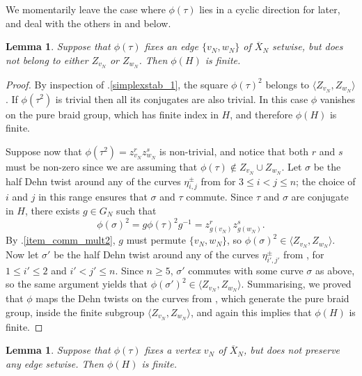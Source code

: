 \documentclass[svgnames]{amsart}
\theoremstyle{plain}
\newtheorem{lem}[thm]{Lemma}
\theoremstyle{definition}
\newcommand{\ov}[1]{\overline{#1}}
\begin{document}
    \noindent We momentarily leave the case where $\phi(\tau)$ lies in a cyclic direction for later, and deal with the others in  and  below.
    \begin{lem}\label{lem:fix_edge}
        Suppose that $\phi(\tau)$ fixes an edge $\{v_N,w_N\}$ of $\ov X_N$ setwise, but does not belong to either $Z_{v_N}$ or $Z_{w_N}$. Then $\phi(H)$ is finite.
    \end{lem}

\begin{proof}
    By inspection of .\eqref{simplexstab_1}, the square $\phi(\tau)^2$ belongs to $\langle Z_{v_N},Z_{w_N}\rangle$. If $\phi(\tau^2)$ is trivial then all its conjugates are also trivial. In this case $\phi$ vanishes on the pure braid group, which has finite index in $H$, and therefore $\phi(H)$ is finite.

    Suppose now that $\phi(\tau^2)=z_{v_N}^r z_{w_N}^s$ is non-trivial, and notice that both $r$ and $s$ must be non-zero since we are assuming that $\phi(\tau)\not \in Z_{v_N}\cup Z_{w_N}$. Let $\sigma$ be the half Dehn twist around any of the curves $\eta^\pm_{i,j}$ from   for $3\le i<j\le n $; the choice of $i$ and $j$ in this range ensures that $\sigma$ and $\tau$ commute. Since $\tau$ and $\sigma$ are conjugate in $H$, there exists $g\in G_N$ such that 
    $$\phi(\sigma)^2=g\phi(\tau)^2g^{-1}=z_{g(v_N)}^r z_{g(w_N)}^s.$$
    By .\eqref{item_comm_mult2}, $g$ must permute $\{v_N,w_N\}$, so $\phi(\sigma)^2\in \langle Z_{v_N}, Z_{w_N}\rangle$. Now let $\sigma'$ be the half Dehn twist around any of the curves $\eta^\pm_{i',j'}$ from , for $1\le i'\le 2$ and $i'<j'\le n $. Since $n\ge 5$, $\sigma'$ commutes with some curve $\sigma$ as above, so the same argument yields that 
    $\phi(\sigma')^2\in \langle Z_{v_N}, Z_{w_N}\rangle$. Summarising, we proved that $\phi$ maps the Dehn twists on the curves from , which generate the pure braid group, inside the finite subgroup $\langle Z_{v_N}, Z_{w_N}\rangle$, and again this implies that $\phi(H)$ is finite.
\end{proof}

\begin{lem}\label{lem:fix_vertex} 
    Suppose that $\phi(\tau)$ fixes a vertex $v_N$ of $\ov X_N$, but does not preserve any edge setwise. Then $\phi(H)$ is finite.
\end{lem}
\end{document}
